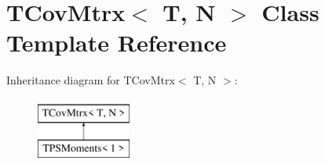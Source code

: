 \hypertarget{classTCovMtrx}{}\section{T\+Cov\+Mtrx$<$ T, N $>$ Class Template Reference}
\label{classTCovMtrx}
Inheritance diagram for T\+Cov\+Mtrx$<$ T, N $>$\+:\begin{figure}[H]
\begin{center}
\leavevmode
\includegraphics[height=2.000000cm]{classTCovMtrx}
\end{center}
\end{figure}
